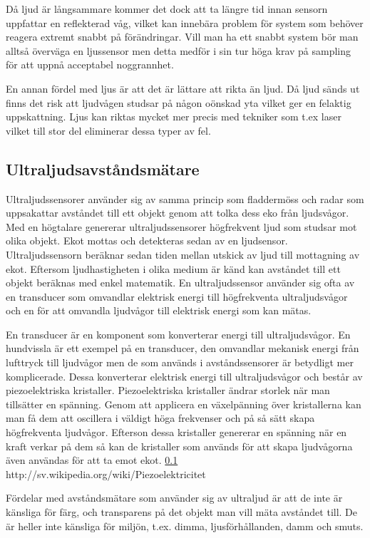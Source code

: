 \documentclass[a4paper,12pt,fleqn]{article}
\begin{document}
Då ljud är långsammare kommer det dock att ta längre tid innan sensorn uppfattar en reflekterad våg, vilket kan innebära problem för system som behöver reagera extremt snabbt på förändringar. Vill man ha ett snabbt system bör man alltså överväga en ljussensor men detta medför i sin tur höga krav på sampling för att uppnå acceptabel noggrannhet.

En annan fördel med ljus är att det är lättare att rikta än ljud. Då ljud sänds ut finns det risk att ljudvågen studsar på någon oönskad yta vilket ger en felaktig uppskattning.
Ljus kan riktas mycket mer precis med tekniker som t.ex laser vilket till stor del eliminerar dessa typer av fel.



\subsection{Ultraljudsavståndsmätare}
Ultraljudssensorer använder sig av samma princip som fladdermöss och radar som uppsakattar avståndet till ett objekt genom att tolka dess eko från ljudsvågor. Med en högtalare genererar ultraljudssensorer högfrekvent ljud som studsar mot olika objekt. Ekot mottas och detekteras sedan av en ljudsensor. Ultraljudssensorn beräknar sedan tiden mellan utskick av ljud till mottagning av ekot. Eftersom ljudhastigheten i olika medium är känd kan avståndet till ett objekt beräknas med enkel matematik. En ultraljudssensor använder sig ofta av en transducer som omvandlar elektrisk energi till högfrekventa ultraljudsvågor och en för att omvandla ljudvågor till elektrisk energi som kan mätas.

En transducer är en komponent som konverterar energi till ultraljudsvågor. En hundvissla är ett exempel på en transducer, den omvandlar mekanisk energi från lufttryck till ljudvågor men de som används i avståndssensorer är betydligt mer komplicerade. Dessa konverterar elektrisk energi till ultraljudsvågor och består av piezoelektriska kristaller. Piezoelektriska kristaller ändrar storlek när man tillsätter en spänning. Genom att applicera en växelpänning över kristallerna kan man få dem att oscillera i väldigt höga frekvenser och på så sätt skapa högfrekventa ljudvågor. Efterson dessa kristaller genererar en spänning när en kraft verkar på dem så kan de kristaller som används för att skapa ljudvågorna även användas för att ta emot ekot.
\ref{} http://sv.wikipedia.org/wiki/Piezoelektricitet

Fördelar med avståndsmätare som använder sig av ultraljud är att de inte är känsliga för färg, och transparens på det objekt man vill mäta avståndet till. De är heller inte känsliga för miljön, t.ex. dimma, ljusförhållanden, damm och smuts.
\end{document}
